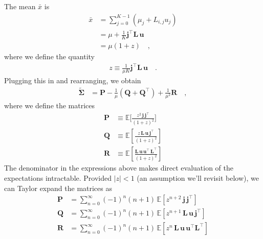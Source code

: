 \documentclass[modern]{aastex62}
\begin{document}
%
The mean $\bar{x}$ is
%
\begin{align}
    \bar{x} & = \sum\limits_{j=0}^{K-1}(\mu_j + L_{i,j}u_j)
    \nonumber                                               \\
            & =
    \mu + \frac{1}{K}\mathbf{j}^\top \mathbf{L} \, \mathbf{u}
    \nonumber                                               \\
            & = \mu(1 + z)
    \quad,
\end{align}
%
where we define the quantity
%
\begin{align}
    z \equiv \frac{1}{\mu K}\mathbf{j}^\top \mathbf{L} \, \mathbf{u}
    \quad.
\end{align}
%
Plugging this in and rearranging, we obtain
%
\begin{align}
    \label{eq:SigmaPQR}
    \tilde{\pmb{\Sigma}}
     & =
    \mathbf{P}
    -
    \frac{1}{\mu}
    \left(
    \mathbf{Q}
    +
    \mathbf{Q}^\top
    \right)
    +
    \frac{1}{\mu^2}
    \mathbf{R}
    \quad,
\end{align}
%
where we define the matrices
%
\begin{align}
    \label{eq:Pexact}
    \mathbf{P} & \equiv
    \mathbb{E}\Big[
        \frac{z^2 \, \mathbf{j} \, \mathbf{j}^\top}{(1 + z)^2}
        \Big]
    \\[0.5em]
    \label{eq:Qexact}
    \mathbf{Q} & \equiv
    \mathbb{E}\left[
        \frac{z\, \mathbf{L} \, \mathbf{u} \, \mathbf{j}^\top}{(1 + z)^2}
        \right]
    \\[0.5em]
    \label{eq:Rexact}
    \mathbf{R} & \equiv
    \mathbb{E}\left[
        \frac{ \mathbf{L} \, \mathbf{u} \, \mathbf{u}^\top \, \mathbf{L}^\top}{(1 + z)^2}
        \right]
\end{align}
%
The denominator in the expressions above makes direct evaluation of the expectations
intractable. Provided
$\big|z| < 1$ (an assumption we'll revisit below), we can Taylor expand the matrices as
%
\begin{align}
    \mathbf{P}
     & =
    \sum\limits_{n=0}^\infty
    (-1)^n (n + 1)
    \,
    \mathbb{E}\left[
        z^{n + 2}
        \,
        \mathbf{j} \, \mathbf{j}^\top
        \right]
    \\[0.5em]
    \mathbf{Q}
     & =
    \sum\limits_{n=0}^\infty
    (-1)^n (n + 1)
    \,
    \mathbb{E}\left[
        z^{n + 1} \,
        \mathbf{L}
        \,
        \mathbf{u}
        \,
        \mathbf{j}^\top
        \right]
    \\[0.5em]
    \mathbf{R}
     & =
    \sum\limits_{n=0}^\infty
    (-1)^n (n + 1)
    \,
    \mathbb{E}\left[
        z^n \, \mathbf{L} \, \mathbf{u} \, \mathbf{u}^\top \mathbf{L}^\top
        \right]
\end{align}
\end{document}
